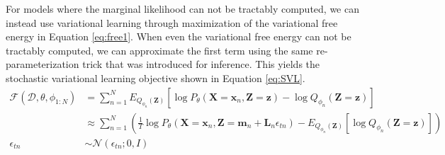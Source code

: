 \documentclass[11pt]{article}
\newcommand{\mbf}[1]{{\mathbf{#1}}}
\begin{document}
For models where the marginal likelihood can not be tractably computed,
we can instead use variational learning through maximization of the variational 
free energy in Equation \ref{eq:free1}. When even the variational free energy 
can not be tractably computed, we can approximate the first term using the 
same re-parameterization trick that was introduced for inference. 
This yields the stochastic variational learning objective shown in 
Equation \ref{eq:SVL}.
%
\begin{align}
\label{eq:free1}
\mathcal{F}(\mathcal{D},\theta,\phi_{1:N}) &= \sum_{n=1}^N 
%
E_{Q_{\phi_n}(\mbf{Z})}[
	   \log P_{\theta}(\mbf{X}=\mbf{x}_n,\mbf{Z}=\mbf{z}) 
	  -\log Q_{\phi_n}(\mbf{Z}=\mbf{z}) 
	   ]\\
%
\label{eq:SVL}
&\approx \sum_{n=1}^N \left(\frac{1}{T} \log P_{\theta}(\mbf{X}=\mbf{x}_n,\mbf{Z}=\mbf{m}_n+\mbf{L}_n\epsilon_{tn})
-E_{Q_{\phi_n}(\mbf{Z})}[\log Q_{\phi_n}(\mbf{Z}=\mbf{z})]\right)\\
\nonumber \epsilon_{tn} &\sim \mathcal{N}(\epsilon_{tn}; 0, I)
\end{align}
\end{document}
